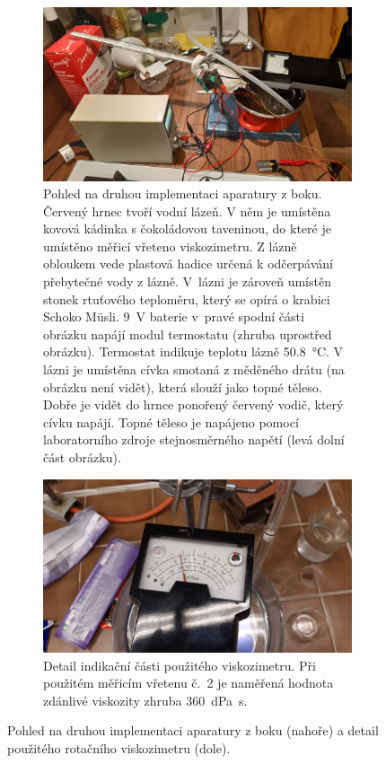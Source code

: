 \documentclass[12pt]{article}
\begin{document}
\begin{figure}
    \begin{subfigure}[t]{\textwidth}
        \centering
        \includegraphics[width = \textwidth]{prilohy/aparatura_bok.jpg}
        \caption{Pohled na druhou implementaci aparatury z boku. Červený hrnec tvoří vodní lázeň. V něm je umístěna kovová kádinka s čokoládovou taveninou, do které je umístěno měřicí vřeteno viskozimetru. Z lázně obloukem vede plastová hadice určená k odčerpávání přebytečné vody z lázně. V~lázni je zároveň umístěn stonek rtuťového teploměru, který se opírá o krabici Schoko Müsli. \SI{9}{\volt} baterie v~pravé spodní části obrázku napájí modul termostatu (zhruba uprostřed obrázku). Termostat indikuje teplotu lázně \SI{50,8}{\degreeCelsius}. V lázni je umístěna cívka smotaná z měděného drátu (na obrázku není vidět), která slouží jako topné těleso. Dobře je vidět do hrnce ponořený červený vodič, který cívku napájí. Topné těleso je napájeno pomocí laboratorního zdroje stejnosměrného napětí (levá dolní část obrázku).}
        \label{fig:aparatura_bok}
    \end{subfigure}
    \hfill
    \begin{subfigure}[t]{\textwidth}
        \includegraphics[width = \textwidth]{prilohy/viskozimetr_1.jpg}
        \caption{Detail indikační části použitého viskozimetru. Při použitém měřicím vřetenu č.~2 je naměřená hodnota zdánlivé viskozity zhruba \SI{360}{\deci\pascal\second}.}
    \end{subfigure}
    \caption{Pohled na druhou implementaci aparatury z boku (nahoře) a detail použitého rotačního viskozimetru (dole).}
\end{figure}
\end{document}
